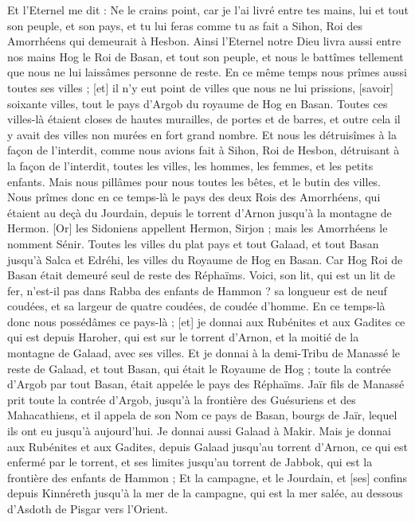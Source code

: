 \begin{multicols}{2}
Et l'Eternel me dit : Ne le crains point, car je l'ai livré entre tes mains, lui et tout son peuple, et son pays, et tu lui feras comme tu as fait a Sihon, Roi des Amorrhéens qui demeurait à Hesbon.
Ainsi l'Eternel notre Dieu livra aussi entre nos mains Hog le Roi de Basan, et tout son peuple, et nous le battîmes tellement que nous ne lui laissâmes personne de reste.
En ce même temps nous prîmes aussi toutes ses villes ; [et] il n'y eut point de villes que nous ne lui prissions, [savoir] soixante villes, tout le pays d'Argob du royaume de Hog en Basan.
Toutes ces villes-là étaient closes de hautes murailles, de portes et de barres, et outre cela il y avait des villes non murées en fort grand nombre.
Et nous les détruisîmes à la façon de l'interdit, comme nous avions fait à Sihon, Roi de Hesbon, détruisant à la façon de l'interdit, toutes les villes, les hommes, les femmes, et les petits enfants.
Mais nous pillâmes pour nous toutes les bêtes, et le butin des villes.
Nous prîmes donc en ce temps-là le pays des deux Rois des Amorrhéens, qui étaient au deçà du Jourdain, depuis le torrent d'Arnon jusqu'à la montagne de Hermon.
[Or] les Sidoniens appellent Hermon, Sirjon ; mais les Amorrhéens le nomment Sénir.
Toutes les villes du plat pays et tout Galaad, et tout Basan jusqu'à Salca et Edréhi, les villes du Royaume de Hog en Basan.
Car Hog Roi de Basan était demeuré seul de reste des Réphaïms. Voici, son lit, qui est un lit de fer, n'est-il pas dans Rabba des enfants de Hammon ? sa longueur est de neuf coudées, et sa largeur de quatre coudées, de coudée d'homme.
En ce temps-là donc nous possédâmes ce pays-là ; [et] je donnai aux Rubénites et aux Gadites ce qui est depuis Haroher, qui est sur le torrent d'Arnon, et la moitié de la montagne de Galaad, avec ses villes.
Et je donnai à la demi-Tribu de Manassé le reste de Galaad, et tout Basan, qui était le Royaume de Hog ; toute la contrée d'Argob par tout Basan, était appelée le pays des Réphaïms.
Jaïr fils de Manassé prit toute la contrée d'Argob, jusqu'à la frontière des Guésuriens et des Mahacathiens, et il appela de son Nom ce pays de Basan, bourgs de Jaïr, lequel ils ont eu jusqu'à aujourd'hui.
Je donnai aussi Galaad à Makir.
Mais je donnai aux Rubénites et aux Gadites, depuis Galaad jusqu'au torrent d'Arnon, ce qui est enfermé par le torrent, et ses limites jusqu'au torrent de Jabbok, qui est la frontière des enfants de Hammon ;
Et la campagne, et le Jourdain, et [ses] confins depuis Kinnéreth jusqu'à la mer de la campagne, qui est la mer salée, au dessous d'Asdoth de Pisgar vers l'Orient.

\end{multicols}
